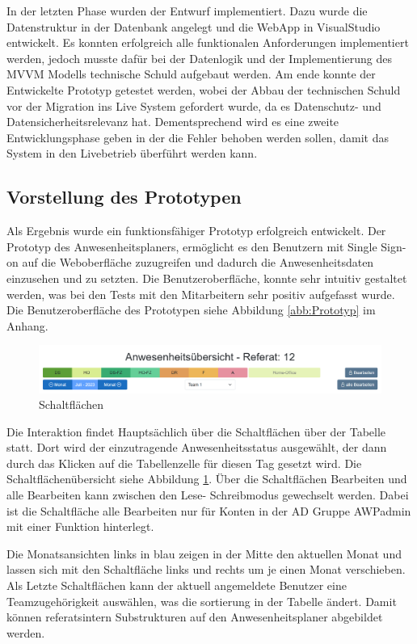 In der letzten Phase wurden der Entwurf implementiert. Dazu wurde die Datenstruktur in der Datenbank angelegt und die WebApp in VisualStudio entwickelt. Es konnten erfolgreich alle funktionalen Anforderungen implementiert werden, jedoch musste dafür bei der Datenlogik und der Implementierung des MVVM Modells technische Schuld aufgebaut werden. Am ende konnte der Entwickelte Prototyp getestet werden, wobei der Abbau der technischen Schuld vor der Migration ins Live System gefordert wurde, da es Datenschutz- und Datensicherheitsrelevanz hat. Dementsprechend wird es eine zweite Entwicklungsphase geben in der die Fehler behoben werden sollen, damit das System in den Livebetrieb überführt werden kann.

\subsection{Vorstellung des Prototypen}
\label{sec:Prototyp}
Als Ergebnis wurde ein funktionsfähiger Prototyp erfolgreich entwickelt. Der Prototyp des Anwesenheitsplaners, ermöglicht es den Benutzern mit Single Sign-on auf die Weboberfläche zuzugreifen und dadurch die Anwesenheitsdaten einzusehen und zu setzten. Die Benutzeroberfläche, konnte sehr intuitiv gestaltet werden, was bei den Tests mit den Mitarbeitern sehr positiv aufgefasst wurde. Die Benutzeroberfläche des Prototypen siehe Abbildung \ref{abb:Prototyp} im Anhang.

\begin{figure}[htb]
    \centering
    \includegraphics[width=1\textwidth,angle=0]{abb/Buttons_GUI.png}
    \caption[Beschreibung]{Schaltflächen}
    \label{abb:Buttons_GUI}
\end{figure}

Die Interaktion findet Hauptsächlich über die Schaltflächen über der Tabelle statt. Dort wird der einzutragende Anwesenheitsstatus ausgewählt, der dann durch das Klicken auf die Tabellenzelle für diesen Tag gesetzt wird. Die Schaltflächenübersicht siehe Abbildung \ref{abb:Buttons_GUI}. Über die Schaltflächen Bearbeiten und alle Bearbeiten kann zwischen den Lese- \bzw Schreibmodus gewechselt werden. Dabei ist die Schaltfläche alle Bearbeiten nur für Konten in der AD Gruppe AWPadmin mit einer Funktion hinterlegt.

Die Monatsansichten links in blau zeigen in der Mitte den aktuellen Monat und lassen sich mit den Schaltfläche links und rechts um je einen Monat verschieben. Als Letzte Schaltflächen kann der aktuell angemeldete Benutzer eine Teamzugehörigkeit auswählen, was die sortierung in der Tabelle ändert. Damit können referatsintern Substrukturen auf den Anwesenheitsplaner abgebildet werden.

